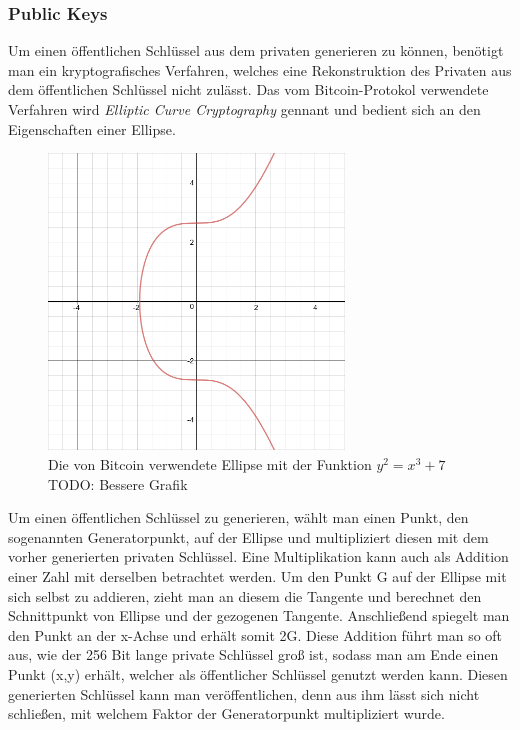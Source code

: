 \subsubsection{Public Keys}
Um einen öffentlichen Schlüssel aus dem privaten generieren zu können, benötigt man ein kryptografisches Verfahren, welches eine Rekonstruktion des Privaten aus dem öffentlichen Schlüssel nicht zulässt.
Das vom Bitcoin-Protokol verwendete Verfahren wird \emph{Elliptic Curve Cryptography} gennant und bedient sich an den Eigenschaften einer Ellipse.
\begin{figure}[htpb]
	\centering
	\includegraphics[width=0.7\textwidth]{images/elliptic_graph_cryptography.png}
	\caption{Die von Bitcoin verwendete Ellipse mit der Funktion $y^{2} = x^{3} + 7$ \\TODO: Bessere Grafik}
	\label{6braun:fig:ellipse}
\end{figure}
Um einen öffentlichen Schlüssel zu generieren, wählt man einen Punkt, den sogenannten Generatorpunkt, auf der Ellipse und multipliziert diesen mit dem vorher generierten privaten Schlüssel. Eine Multiplikation kann auch als Addition einer Zahl mit derselben betrachtet werden. Um den Punkt G auf der Ellipse mit sich selbst zu addieren, zieht man an diesem die Tangente und berechnet den Schnittpunkt von Ellipse und der gezogenen Tangente. Anschließend spiegelt man den Punkt an der x-Achse und erhält somit 2G. Diese Addition führt man so oft aus, wie der 256 Bit lange private Schlüssel groß ist, sodass man am Ende einen Punkt (x,y) erhält, welcher als öffentlicher Schlüssel genutzt werden kann. Diesen generierten Schlüssel kann man veröffentlichen, denn aus ihm lässt sich nicht schließen, mit welchem Faktor der Generatorpunkt multipliziert wurde.


